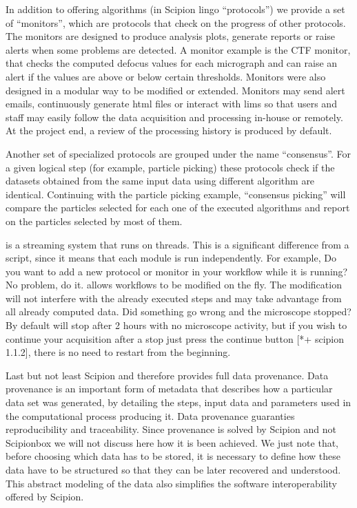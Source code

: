 In addition to offering algorithms (in Scipion lingo ``protocols'') we provide 
a set of ``monitors'', which are protocols that  check on the progress of other protocols. The monitors are designed to produce analysis plots, generate reports or raise alerts when some problems are detected. A monitor example is the CTF monitor, that checks the computed defocus values for
each micrograph and can raise an alert if the values are above or below certain thresholds.
Monitors were also designed in a modular way to be modified or extended. 
Monitors may send alert emails, continuously generate html files or interact with lims so that users and staff may easily follow the data acquisition and processing in-house or remotely. At the project end, a review of the processing history is produced by default.

Another set of  specialized protocols are grouped under the name ``consensus''. For a given logical step (for example, particle picking) these protocols check if the datasets obtained from the same input data using different algorithm are identical. Continuing with the particle picking example, ``consensus picking'' will compare the particles selected for each one of the executed algorithms and report on the particles selected by most of them.

\scipionbox is a streaming system that runs on threads. This is a significant difference from a script, since it means that each module is run independently. For example, Do you want to add a new protocol or monitor in your workflow while it is running? No problem, do it. \scipionbox allows workflows to be  modified on the fly. The modification will not interfere with the already executed steps and may take advantage from all already computed data. Did something go wrong and the microscope stopped? By default \scipionbox will stop after 2 hours with no microscope activity, but if you wish to continue your acquisition after a stop just press the continue button [*+ scipion 1.1.2], there is no need to restart from the beginning.

Last but not least Scipion and therefore \scipionbox provides full data provenance. Data provenance is an important form of metadata that describes how a particular data set was generated, by detailing the steps, input data and parameters used in the computational process producing it. Data provenance guaranties reproducibility and traceability. Since provenance is solved by Scipion and not Scipionbox we will not discuss here how it is been achieved. We just note that, before choosing which data has to be stored, it is necessary to define how these data have to be structured so that they can be later recovered and understood. This abstract modeling of the data also simplifies the software interoperability offered by Scipion.




 

